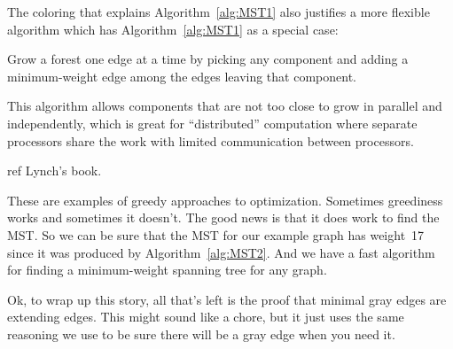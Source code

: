 The coloring that explains Algorithm~\ref{alg:MST1} also justifies a more
flexible algorithm which has Algorithm~\ref{alg:MST1} as a special case:
\begin{algorithm}\label{alg:MST3}
  Grow a forest one edge at a time by picking any component and adding a
  minimum-weight edge among the edges leaving that component.
\end{algorithm}
This algorithm allows components that are not too close to grow in
parallel and independently, which is great for ``distributed'' computation
where separate processors share the work with limited communication
between processors.

\begin{editingnotes}
ref Lynch's book.
\end{editingnotes}

These are examples of greedy approaches to optimization.  Sometimes
greediness works and sometimes it doesn't.  The good news is that it
does work to find the MST.  So we can be sure that the MST for our
example graph has weight~17 since it was produced by
Algorithm~\ref{alg:MST2}.  And we have a fast algorithm for finding a
minimum-weight spanning tree for any graph.

Ok, to wrap up this story, all that's left is the proof that minimal
gray edges are extending edges.  This might sound like a chore, but it
just uses the same reasoning we use to be sure there will be a gray
edge when you need it.

